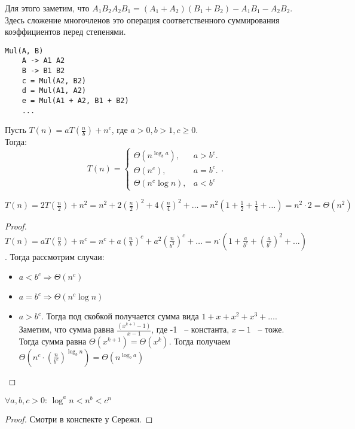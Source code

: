 Для этого заметим, что $A_1B_2A_2B_1=(A_1+A_2)(B_1+B_2) - A_1B_1 - A_2B_2$. Здесь сложение многочленов это операция соответственного суммирования коэффициентов перед степенями.
\begin{lstlisting}
Mul(A, B)
    A -> A1 A2
    B -> B1 B2
    c = Mul(A2, B2)
    d = Mul(A1, A2)
    e = Mul(A1 + A2, B1 + B2)
    ...
\end{lstlisting}
\begin{theorem}    
Пусть $T(n) = aT(\frac{n}{b}) + n^{c}$, где $a>0, b>1, c\ge0$.\\
Тогда:
\[
    T(n) = \begin{cases}
        \Theta(n^{\log_b a}), & a > b^c.\\
        \Theta(n^c), & a = b^c.\\
        \Theta(n^c \log n),& a < b^c
    \end{cases}
.\] 
\end{theorem}
\begin{example}
    $T(n) = 2T(\frac{n}{2}) + n^2 = n^2 + 2(\frac{n}{2})^2 + 4(\frac{n}{4})^2 + \ldots = n^2(1 + \frac{1}{2} + \frac{1}{4} + \ldots) = n^2 \cdot 2 = \Theta(n^2)$
\end{example}
\begin{proof}
    $T(n) = aT(\frac{n}{b})+n^c=n^c + a (\frac{n}{b})^c + a^2 (\frac{n}{b^2})^c + \ldots = n^ \cdot (1 + \frac{a}{b^c} + (\frac{a}{b^c})^2 + \ldots)$.
    Тогда рассмотрим случаи:
    \begin{itemize}
        \item $a < b^c \Rightarrow \Theta(n^c)$
        \item $a = b^c \Rightarrow \Theta(n^c \log n)$ 
        \item $a > b^c$. Тогда под скобкой получается сумма вида  $1+x+x^2+x^3+\ldots$. Заметим, что сумма равна $\frac{(x^{k+1}-1)}{x - 1}$, где -1 ~-- константа, $x - 1$ ~-- тоже. Тогда сумма равна $\Theta(x^{k+1}) = \Theta(x^k)$. Тогда получаем $\Theta(n^c \cdot (\frac{n}{b^c})^{\log_b n}) = \Theta(n^{\log_b a})$
    \end{itemize}
\end{proof}
\begin{statement}
    $\forall a, b, c > 0\text{:  } \log^a n < n^b < c^n$
\end{statement}
\begin{proof}
    Смотри в конспекте у Сережи.
\end{proof}
